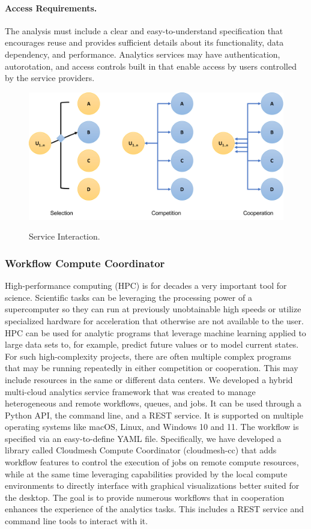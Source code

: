 \documentclass[utf8]{FrontiersinVancouver} %
\begin{document}
\paragraph{Access Requirements.}
The analysis must include a clear and easy-to-understand specification
that encourages reuse and provides sufficient details about its
functionality, data dependency, and performance. Analytics services may
have authentication, autorotation, and access controls built in that
enable access by users controlled by the service providers.



\begin{figure}[htb]
\centering\includegraphics[width=0.75\columnwidth]{images/processes-nist.pdf}
\label{fig:service-interaction}
\caption{Service Interaction.}
\end{figure}


\subsubsection{Workflow Compute Coordinator}

High-performance computing (HPC) is for decades a very important tool
for science. Scientific tasks can be leveraging the processing power
of a supercomputer so they can run at previously unobtainable high
speeds or utilize specialized hardware for acceleration that otherwise
are not available to the user. HPC can be used for analytic programs
that leverage machine learning applied to large data sets to, for
example, predict future values or to model current states. For such
high-complexity projects, there are often multiple complex programs
that may be running repeatedly in either competition or cooperation.
This may include resources in the same or different data centers. We
developed a hybrid multi-cloud analytics service framework that was
created to manage heterogeneous and remote workflows, queues, and
jobs.  It can be used through a Python API, the command line, and a
REST service. It is supported on multiple operating systems like
macOS, Linux, and Windows 10 and 11.  The workflow is specified via an
easy-to-define YAML file.  Specifically, we have developed a library
called Cloudmesh Compute Coordinator (cloudmesh-cc) that adds workflow
features to control the execution of jobs on remote compute resources,
while at the same time leveraging capabilities provided by the local
compute environments to directly interface with graphical
visualizations better suited for the desktop. The goal is to provide
numerous workflows that in cooperation enhances the experience of the
analytics tasks. This includes a REST service and command line tools
to interact with it.
\end{document}
